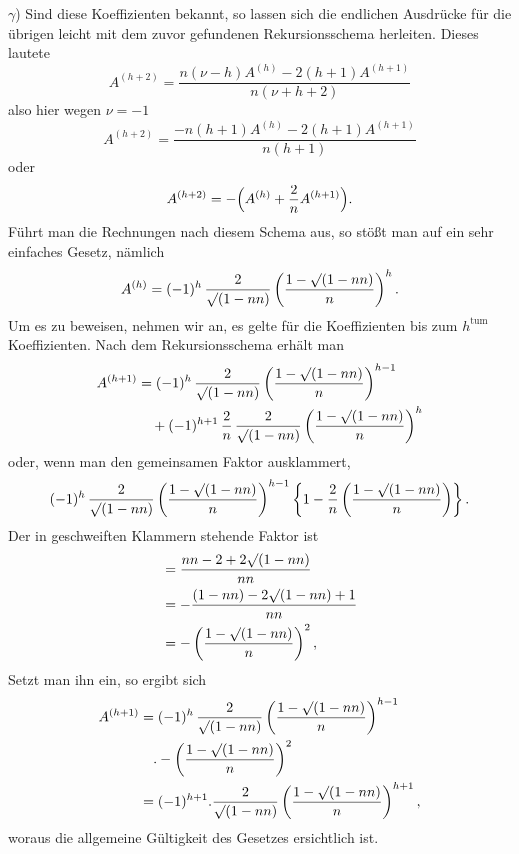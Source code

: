 $\gamma$) Sind diese Koeffizienten bekannt, so lassen sich die endlichen Ausdrücke für die übrigen leicht mit dem zuvor gefundenen Rekursionsschema herleiten. Dieses lautete
\[
A^{(h+2)} = \frac{n(\nu-h)A^{(h)} - 2(h+1)A^{(h+1)}}{n(\nu+h+2)}
\]
also hier wegen $\nu=-1$
\[
A^{(h+2)} = \frac{-n(h+1)A^{(h)} - 2(h+1)A^{(h+1)}}{n(h+1)}
\]
oder
\[
A^{(h+2)} = -\Bigl(A^{(h)} + \frac{2}{n}A^{(h+1)}\Bigr).
\]
Führt man die Rechnungen nach diesem Schema aus, so stößt man auf ein sehr einfaches Gesetz, nämlich
\[
A^{(h)} = (-1)^h\,\frac{2}{\mathord{\surd}(1-nn)}\left(\frac{1-\mathord{\surd}(1-nn)}{n}\right)^{h}.
\]
Um es zu beweisen, nehmen wir an, es gelte für die Koeffizienten bis zum $h^{\text{tum}}$ Koeffizienten. Nach dem Rekursionsschema erhält man
\[
\begin{aligned}
A^{(h+1)} & = (-1)^h\,\frac{2}{\mathord{\surd}(1-nn)}\left(\frac{1-\mathord{\surd}(1-nn)}{n}\right)^{h-1}\\&\quad + (-1)^{h+1}\,\frac{2}{n}\,\frac{2}{\mathord{\surd}(1-nn)}\left(\frac{1-\mathord{\surd}(1-nn)}{n}\right)^{h}
\end{aligned}
\]
oder, wenn man den gemeinsamen Faktor ausklammert,
\[
(-1)^h\,\frac{2}{\mathord{\surd}(1-nn)}\left(\frac{1-\mathord{\surd}(1-nn)}{n}\right)^{h-1}\left\{1-\frac{2}{n}\left(\frac{1-\mathord{\surd}(1-nn)}{n}\right)\right\}.
\]
Der in geschweiften Klammern stehende Faktor ist
\[
\begin{aligned}
&= \frac{nn-2+2\mathord{\surd}(1-nn)}{nn}\\&= -\frac{(1-nn)-2\mathord{\surd}(1-nn)+1}{nn}\\&= -\left(\frac{1-\mathord{\surd}(1-nn)}{n}\right)^{2},
\end{aligned}
\]
Setzt man ihn ein, so ergibt sich
\[
\begin{aligned}
A^{(h+1)} & = (-1)^h\,\frac{2}{\mathord{\surd}(1-nn)}\left(\frac{1-\mathord{\surd}(1-nn)}{n}\right)^{h-1}\\&\quad .  -\left(\frac{1-\mathord{\surd}(1-nn)}{n}\right)^{2}\\&= (-1)^{h+1} . \frac{2}{\mathord{\surd}(1-nn)}\left(\frac{1-\mathord{\surd}(1-nn)}{n}\right)^{h+1},
\end{aligned}
\]
woraus die allgemeine Gültigkeit des Gesetzes ersichtlich ist.

